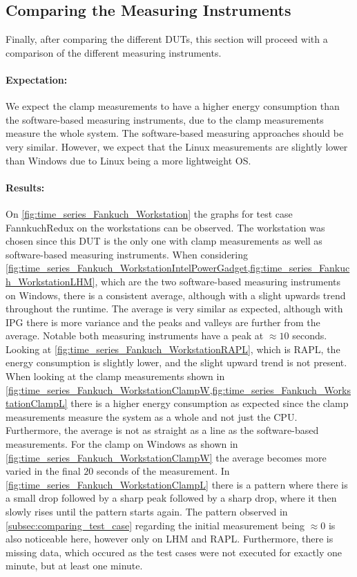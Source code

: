 
\subsection{Comparing the Measuring Instruments}
Finally, after comparing the different DUTs, this section will proceed with a comparison of the different measuring instruments.

\paragraph{Expectation:}
We expect the clamp measurements to have a higher energy consumption than the software-based measuring instruments, due to the clamp measurements measure the whole system. The software-based measuring approaches should be very similar. However, we expect that the Linux measurements are slightly lower than Windows due to Linux being a more lightweight OS.

\paragraph{Results:}
On \cref{fig:time_series_Fankuch_Workstation} the graphs for test case FannkuchRedux on the workstations can be observed. The workstation was chosen since this DUT is the only one with clamp measurements as well as software-based measuring instruments. When considering \cref{fig:time_series_Fankuch_WorkstationIntelPowerGadget,fig:time_series_Fankuch_WorkstationLHM}, which are the two software-based measuring instruments on Windows, there is a consistent average, although with a slight upwards trend throughout the runtime. The average is very similar as expected, although with IPG there is more variance and the peaks and valleys are further from the average. Notable both measuring instruments have a peak at $\approx10$ seconds. Looking at \cref{fig:time_series_Fankuch_WorkstationRAPL}, which is RAPL, the energy consumption is slightly lower, and the slight upward trend is not present. When looking at the clamp measurements shown in \cref{fig:time_series_Fankuch_WorkstationClampW,fig:time_series_Fankuch_WorkstationClampL} there is a higher energy consumption as expected since the clamp measurements measure the system as a whole and not just the CPU. Furthermore, the average is not as straight as a line as the software-based measurements. For the clamp on Windows as shown in \cref{fig:time_series_Fankuch_WorkstationClampW} the average becomes more varied in the final $20$ seconds of the measurement. In \cref{fig:time_series_Fankuch_WorkstationClampL} there is a pattern where there is a small drop followed by a sharp peak followed by a sharp drop, where it then slowly rises until the pattern starts again. The pattern observed in \cref{subsec:comparing_test_case} regarding the initial measurement being $\approx0$ is also noticeable here, however only on LHM and RAPL. Furthermore, there is missing data, which occured as the test cases were not executed for exactly one minute, but at least one minute.

